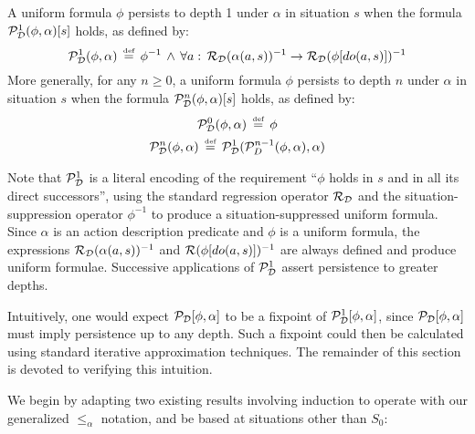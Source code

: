 \begin{defnL}
 A uniform formula $\phi$ persists
to depth 1 under $\alpha$ in situation $s$ when the formula $\mathcal{P}_{\mathcal{D}}^{1}(\phi,\alpha)[s]$
holds, as defined by:\label{def:persists-depth-n}\[
\mathcal{P}_{\mathcal{D}}^{1}(\phi,\alpha)\,\stackrel{\mbox{\tiny def}}{=}\,\phi^{-1}\,\wedge\,\forall a:\,\mathcal{R}_{\mathcal{D}}(\alpha(a,s))^{-1}\rightarrow\mathcal{R}_{\mathcal{D}}(\phi[do(a,s)])^{-1}\]
 More generally, for any $n\geq0$, a uniform formula $\phi$ persists
to depth $n$ under $\alpha$ in situation $s$ when the formula $\mathcal{P}_{\mathcal{D}}^{n}(\phi,\alpha)[s]$
holds, as defined by:\begin{gather*}
\mathcal{P}_{\mathcal{D}}^{0}(\phi,\alpha)\,\stackrel{\mbox{\tiny def}}{=}\,\phi\\
\mathcal{P}_{\mathcal{D}}^{n}(\phi,\alpha)\,\stackrel{\mbox{\tiny def}}{=}\,\mathcal{P}_{\mathcal{D}}^{1}(\mathcal{P}_{D}^{n-1}(\phi,\alpha),\alpha)\end{gather*}

\end{defnL}
Note that $\mathcal{P}_{\mathcal{D}}^{1}$ is a literal encoding of
the requirement {}``$\phi$ holds in $s$ and in all its direct successors'',
using the standard regression operator $\mathcal{R}_{\mathcal{D}}$ and the situation-suppression
operator $\phi^{-1}$ to produce a situation-suppressed uniform formula.
Since $\alpha$ is an action description predicate and $\phi$ is
a uniform formula, the expressions $\mathcal{R}_{\mathcal{D}}(\alpha(a,s))^{-1}$
and $\mathcal{R}(\phi[do(a,s)])^{-1}$ are always defined and produce uniform
formulae. Successive applications of $\mathcal{P}_{\mathcal{D}}^{1}$
assert persistence to greater depths.

Intuitively, one would expect $\mathcal{P}_{\mathcal{D}}[\phi,\alpha]$
to be a fixpoint of $\mathcal{P}_{\mathcal{D}}^{1}[\phi,\alpha]$,
since $\mathcal{P}_{\mathcal{D}}[\phi,\alpha]$ must imply persistence
up to any depth. Such a fixpoint could then be calculated using standard
iterative approximation techniques. The remainder of this section
is devoted to verifying this intuition.

We begin by adapting two existing results involving induction to operate
with our generalized $\leq_{\alpha}$ notation, and be based at situations
other than $S_{0}$:

